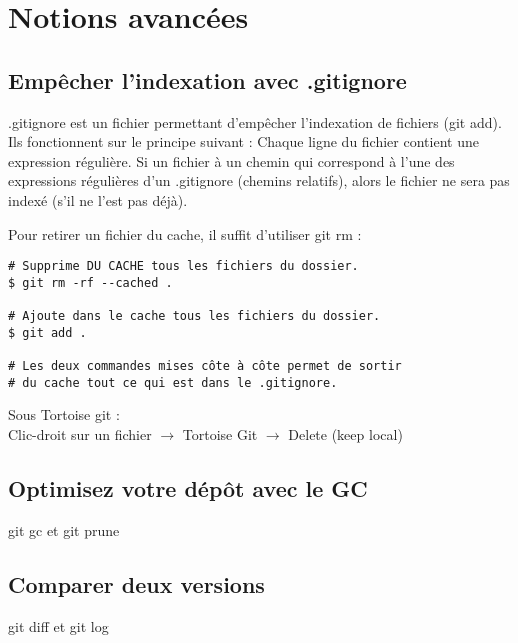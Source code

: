 \chapter{Notions avancées}
\section{Empêcher l'indexation avec .gitignore}

.gitignore est un fichier permettant d'empêcher l'indexation de fichiers (git add).\\
Ils fonctionnent sur le principe suivant : Chaque ligne du fichier contient une expression régulière. Si un fichier à un chemin qui correspond à l'une des expressions régulières d'un .gitignore (chemins relatifs), alors le fichier ne sera pas indexé (s'il ne l'est pas déjà).

Pour retirer un fichier du cache, il suffit d'utiliser git rm :
\begin{verbatim}
# Supprime DU CACHE tous les fichiers du dossier.
$ git rm -rf --cached .

# Ajoute dans le cache tous les fichiers du dossier.
$ git add .

# Les deux commandes mises côte à côte permet de sortir
# du cache tout ce qui est dans le .gitignore.
\end{verbatim}

Sous Tortoise git :\\

Clic-droit sur un fichier $\rightarrow$ Tortoise Git $\rightarrow$ Delete (keep local)

\section[Optimisez votre dépôt avec le Garbage Collector]{Optimisez votre dépôt avec le GC}

git gc et git prune

\section{Comparer deux versions}

git diff et git log